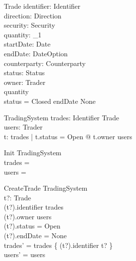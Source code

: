 \documentclass{article}
\begin{document}
\vspace{-0.4cm} 

\begin{schema}{Trade}
identifier: Identifier \\
direction: Direction \\ 
security: Security \\
quantity: \nat_1 \\
startDate: Date \\
endDate: DateOption \\ 
counterparty: Counterparty \\
status: Status \\
owner: Trader \\
\where
quantity  \\
status = Closed \implies endDate \neq None \\
\end{schema}

\vspace{-0.4cm} 

\begin{schema}{TradingSystem}
trades: Identifier \pfun Trade \\
users: \power Trader \\
\where
\forall t: \ran trades | t.status = Open @ t.owner \in users \\ 
\end{schema}

\begin{schema}{Init}
TradingSystem \\
\where
trades = \emptyset \\
users = \emptyset \\
\end{schema}

\vspace{-0.4cm} 

\begin{schema}{CreateTrade}
\Delta TradingSystem \\
t?: Trade \\
\where 
(t?).identifier \notin \dom trades \\
(t?).owner \in users \\
(t?).status = Open \\ 
(t?).endDate = None \\
trades' = trades \cup \{ (t?).identifier \mapsto t? \} \\
users' = users \\
\end{schema}
  
\end{document}
